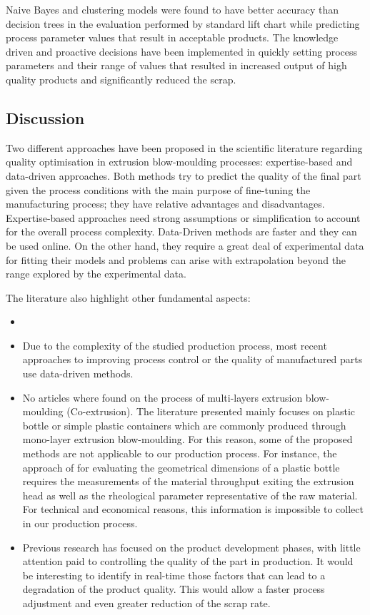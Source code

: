 Naive Bayes and clustering models were found to have better accuracy than decision trees in the evaluation performed by standard lift chart while predicting process parameter values that result in acceptable products. The knowledge driven and proactive decisions have been implemented in quickly setting process parameters and their range of values that resulted in increased output of high quality products and significantly reduced the scrap.

\subsection{Discussion} \label{Discussion}

Two different approaches have been proposed in the  scientific literature regarding quality optimisation in extrusion blow-moulding processes: expertise-based and data-driven approaches. Both methods try to predict the quality of the final part given the process conditions with the main purpose of fine-tuning the manufacturing process; they have relative advantages and disadvantages. Expertise-based approaches need strong assumptions or simplification to account for the overall process complexity. Data-Driven methods are faster and they can be used online. On the other hand, they require a great deal of experimental data for fitting their models and problems can arise with extrapolation beyond the range explored by the experimental data. 

The literature also highlight other fundamental aspects:

\begin{itemize}
    \item 
    \item Due to the complexity of the studied production process, most recent approaches to improving process control or the quality of manufactured parts use data-driven methods.
    \item No articles where found on the process of multi-layers extrusion blow-moulding (Co-extrusion). The literature presented mainly focuses on plastic bottle or simple plastic containers which are commonly produced through mono-layer extrusion blow-moulding. For this reason, some of the proposed methods are not applicable to our production process. For instance, the approach of \citet{diraddo1993line} for evaluating the geometrical dimensions of a plastic bottle requires the measurements of the material throughput exiting the extrusion head as well as the rheological parameter representative of the raw material. For technical and economical reasons, this information is impossible to collect in our production process.
    \item Previous research has focused on the product development phases, with little attention paid to controlling the quality of the part in production. It would be interesting to identify in real-time those factors that can lead to a degradation of the product quality. This would allow a faster process adjustment and even greater reduction of the scrap rate.

\end{itemize}

